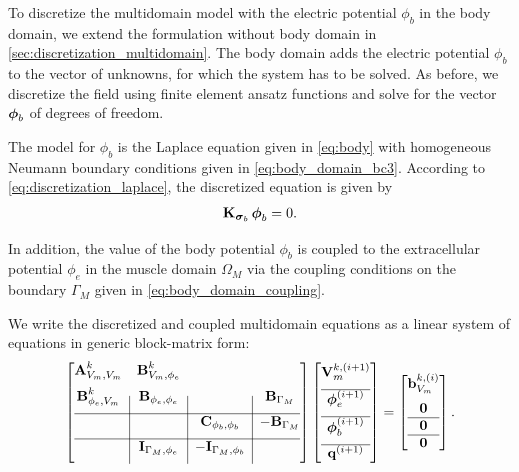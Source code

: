 To discretize the multidomain model with the electric potential $\phi_b$ in the body domain, we extend the formulation without body domain in \cref{sec:discretization_multidomain}.
The body domain adds the electric potential $\phi_b$ to the vector of unknowns, for which the system has to be solved. As before, we discretize the field using finite element ansatz functions and solve for the vector $\boldsymbol{\phi}_b$ of degrees of freedom.

The model for $\phi_b$ is the Laplace equation given in \cref{eq:body} with homogeneous Neumann boundary conditions given in \cref{eq:body_domain_bc3}. According to \cref{eq:discretization_laplace}, the discretized equation is given by
\begin{align}\label{eq:discretized_body}
  \textbf{K}_{\boldsymbol{\sigma}_b}\,\boldsymbol{\phi}_b = 0.
\end{align}

In addition, the value of the body potential $\phi_b$ is coupled to the extracellular potential $\phi_e$ in the muscle domain $\Omega_M$ via the coupling conditions on the boundary $\Gamma_M$ given in \cref{eq:body_domain_coupling}.

We write the discretized and coupled multidomain equations as a linear system of equations in generic block-matrix form:
\begin{align}\label{eq:discretized_multidomain_body}
  \left[
  \begin{array}{@{}c|c|c|c@{}}
    \bfA_{V_m,V_m}^k & \bfB_{V_m,\phi_e}^k & &\\[2mm]
    \bfB_{\phi_e,V_m}^k & \bfB_{\phi_e,\phi_e} & &\bfB_{\Gamma_M} \\[2mm] \hline
    &&\bfC_{\phi_b,\phi_b} & -\bfB_{\Gamma_M}\\[2mm]\hline
    & \bfI_{\Gamma_M,\phi_e} & -\bfI_{\Gamma_M,\phi_b} &\\[2mm]
  \end{array}
  \right]
  \left[
  \begin{array}{@{}c@{}}
    \bfV_{m}^{k,(i+1)}  \\[2mm]\hline 
    \bfphi_{e}^{(i+1)} \\[2mm]\hline
    \bfphi_{b}^{(i+1)}  \\[2mm]\hline
    \bfq^{(i+1)}
  \end{array}\right]
  = 
  \left[\begin{array}{@{}c@{}}
    \bfb_{V_m}^{k,(i)} \\[2mm]
    \bfzero\\\hline
    \bfzero\\\hline 
    \bfzero
  \end{array}\right].
\end{align}


